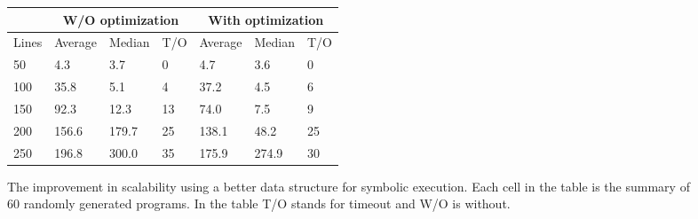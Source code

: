 \documentclass{llncs}
\begin{document}
\begin{figure}[htb]

	\begin{minipage}{0.6\textwidth}
\begin{tabular}{|l|l|l|l|l|l|l|}
	\hline
	& \multicolumn{3}{c|}{\small W/O optimization}	& \multicolumn{3}{c|}{\small With optimization} \\
	\hline
	\small Lines & \small Average & \small Median & \small T/O & \small Average & \small Median & \small T/O \\
	\hline
	\hline
	50	&	4.3	    &   3.7	&	0	&	4.7	&	3.6	&	0	\\
	\hline
	100	&	35.8	&	5.1&	4	&	37.2	&	4.5	&	6	\\
	\hline
	150	&	92.3	&	12.3&	13	&	74.0	&	7.5	&	9	\\
	\hline
	200	&	156.6	&	179.7&	25	&	138.1	&	48.2	&	25	\\
	\hline
	250	&	196.8	&	300.0&	35	&	175.9	&	274.9	&	30	\\
	\hline
\end{tabular}
	\end{minipage}
	\begin{minipage}{0.4\textwidth}
	\end{minipage}


	\caption{The improvement in scalability using a better data structure for symbolic execution. Each cell in the table is the summary of 60 randomly generated programs. In the table T/O stands for timeout and W/O is without. }
	\label{tab:opt2}
\end{figure}
\end{document}
